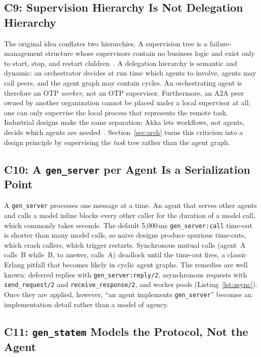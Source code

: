 \documentclass[conference,letterpaper]{IEEEtran}
\newcommand{\code}[1]{\texttt{#1}}
\newcommand{\gs}{\code{gen\_server}}
\newcommand{\gsm}{\code{gen\_statem}}
\begin{document}
\subsection{C9: Supervision Hierarchy Is Not Delegation Hierarchy}\label{sec:conflation}

The original idea conflates two hierarchies. A supervision tree is a
failure-management structure whose supervisors contain no business logic
and exist only to start, stop, and restart children~\cite{otp-sup-princ}. A
delegation hierarchy is semantic and dynamic: an orchestrator decides at run
time which agents to involve, agents may call peers, and the agent graph may
contain cycles. An orchestrating agent is therefore an OTP \emph{worker},
not an OTP supervisor. Furthermore, an A2A peer owned by another
organization cannot be placed under a local supervisor at all; one can only
supervise the local process that represents the remote task. Industrial
designs make the same separation: Akka lets workflows, not agents, decide
which agents are needed~\cite{akka-patterns}. Section~\ref{sec:arch} turns
this criticism into a design principle by supervising the \emph{task} tree
rather than the agent graph.

\subsection{C10: A \gs{} per Agent Is a Serialization Point}

A \gs{} processes one message at a time. An agent that serves other agents
and calls a model inline blocks every other caller for the duration of a
model call, which commonly takes seconds. The default 5{,}000\,ms
\code{gen\_server:call} time-out~\cite{otp-genserver} is shorter than many
model calls, so naive designs produce spurious time-outs, which crash
callers, which trigger restarts. Synchronous mutual calls (agent~A calls~B
while~B, to answer, calls~A) deadlock until the time-out fires, a classic
Erlang pitfall that becomes likely in cyclic agent graphs. The remedies are
well known: deferred replies with \code{gen\_server:reply/2}, asynchronous
requests with \code{send\_request/2} and \code{receive\_response/2}, and
worker pools (Listing~\ref{lst:async}). Once they are applied, however,
``an agent implements \gs'' becomes an implementation detail rather than a
model of agency.

\subsection{C11: \gsm{} Models the Protocol, Not the Agent}
\end{document}
